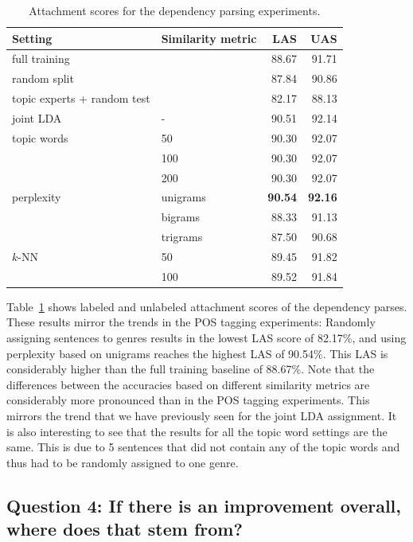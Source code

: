   \begin{table}[t!]
\centering
\begin{tabular}{l|l|rr|}
Setting &Similarity metric & LAS &UAS \\ \hline
full training & & 88.67 & 91.71 \\ 
random split &  & 87.84 & 90.86 \\ 
topic experts + random test &  & 82.17 & 88.13 \\ \hline
joint LDA & -& 90.51 & 92.14 \\ \hline
topic words & 50 & 90.30 & 92.07 \\
 & 100 & 90.30 & 92.07 \\
 & 200 & 90.30 & 92.07 \\ \hline
perplexity & unigrams & \textbf{90.54} & \textbf{92.16} \\
 & bigrams & 88.33 & 91.13 \\
 & trigrams & 87.50 & 90.68 \\ \hline
$k$-NN  &50 & 89.45 & 91.82 \\
 & 100 & 89.52 & 91.84 \\ \hline
\end{tabular}
\caption{Attachment scores for the dependency parsing experiments.}
\label{tab:overallresultsdep}
\end{table}

Table~\ref{tab:overallresultsdep} shows labeled and unlabeled attachment scores of the dependency parses. These results mirror the trends in the POS tagging experiments: Randomly assigning sentences to genres results in the lowest LAS score of 82.17\%, and using perplexity based on unigrams reaches the highest LAS of 90.54\%. This LAS is considerably higher than the full training baseline of 88.67\%. Note that the differences between the accuracies based on different similarity metrics are considerably more pronounced than in the POS tagging experiments. This mirrors the trend that we have previously seen for the joint LDA assignment. It is also interesting to see that the results for all the topic word settings are the same. This is due to 5 sentences that did not contain any of the topic words and thus had to be randomly assigned to one genre. 


\subsection*{Question 4: If there is an improvement overall, where does that stem from?}

